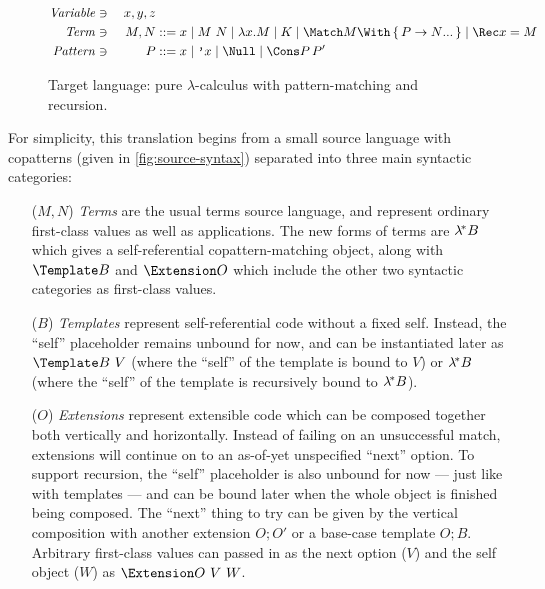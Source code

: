 \begin{figure}[t]
\centering
\begin{alignat*}{2}
  \mathit{Variable} &\ni{}& x, y, z
  \\
  \mathit{Term} &\ni{}& M, N
  &::= x
  \mid M ~ N
  \mid \lambda x. M
  \mid K
  \mid \Match M \With \set{\many{P \to N}}
  \mid \Rec x = M
  \\
  \mathit{Pattern} &\ni{}& P
  &::= x
  \mid \q{x}
  \mid \Null
  \mid \Cons P \, P'
\end{alignat*}

\caption{Target language: pure $\lambda$-calculus with pattern-matching and recursion.}
\label{fig:target-syntax}
\end{figure}

For simplicity, this translation begins from a small source language with copatterns (given in \cref{fig:source-syntax}) separated into three main syntactic categories:
\begin{itemize}
\item[($M, N$)] \emph{Terms} are the usual terms source language, and represent ordinary first-class values as well as applications.
  The new forms of terms are $\lambda^{\!*} B$ which gives a self-referential copattern-matching object, along with $\Template B$ and $\Extension O$ which include the other two syntactic categories as first-class values.
\item[($B$)] \emph{Templates} represent self-referential code without a fixed self.
  Instead, the ``self'' placeholder remains unbound for now, and can be instantiated later as $\Template B ~ V$ (where the ``self'' of the template is bound to $V$) or $\lambda^{\!*} B$ (where the ``self'' of the template is recursively bound to $\lambda^{\!*} B$).
\item[($O$)] \emph{Extensions} represent extensible code which can be composed together both vertically and horizontally.
  Instead of failing on an unsuccessful match, extensions will continue on to an as-of-yet unspecified ``next'' option.
  To support recursion, the ``self'' placeholder is also unbound for now --- just like with templates --- and can be bound later when the whole object is finished being composed.
  The ``next'' thing to try can be given by the vertical composition with another extension $O; O'$ or a base-case template $O; B$.
  Arbitrary first-class values can passed in as the next option ($V$) and the self object ($W$) as $\Extension O ~ V ~ W$.
\end{itemize}

